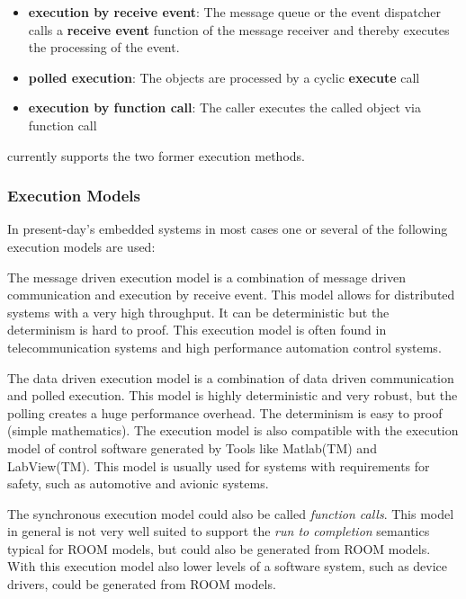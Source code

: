 \begin{itemize}
\item \textbf{execution by receive event}: The message queue or the event dispatcher calls a 
\textbf{receive event} function of the message receiver and thereby executes the processing of the event.
\item \textbf{polled execution}: The objects are processed by a cyclic \textbf{execute} call
\item \textbf{execution by function call}: The caller executes the called object via function call
\end{itemize}

\eTrice{} currently supports the two former execution methods.

\subsubsection{Execution Models}

In present-day's embedded systems in most cases one or several of the following execution models are used:


The message driven execution model is a combination of message driven communication and execution by 
receive event.
This model allows for distributed systems with a very high throughput.
It can be deterministic but the determinism is hard to proof.
This execution model is often found in telecommunication systems and high performance automation control 
systems.


The data driven execution model is a combination of data driven communication and polled execution.
This model is highly deterministic and very robust, but the polling creates a huge performance overhead.
The determinism is easy to proof (simple mathematics). 
The execution model is also compatible with the execution model of control software generated by Tools 
like Matlab(TM) and LabView(TM).
This model is usually used for systems with requirements for safety, such as automotive and avionic systems.


The synchronous execution model could also be called \emph{function calls}. 
This model in general is not very well suited to support the \emph{run to completion} semantics typical 
for ROOM models, but could also be generated from ROOM models. 
With this execution model also lower levels of a software system, such as device drivers, could be 
generated from ROOM models.
